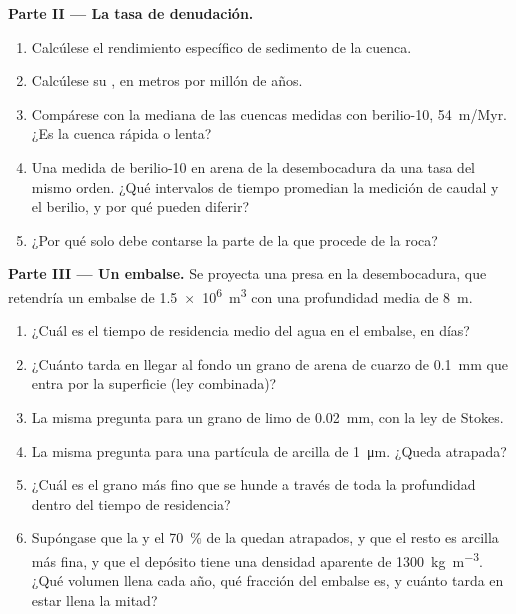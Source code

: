 \begin{problem}
\medskip
\noindent\textbf{Parte II --- La tasa de denudación.}
\begin{enumerate}[resume]
  \item Calcúlese el rendimiento específico de sedimento de la cuenca.
  \item Calcúlese su , en metros por millón de años.
  \item Compárese con la mediana de las cuencas medidas con berilio-10, \qty{54}{m/Myr}. ¿Es la cuenca rápida o lenta?
  \item Una medida de berilio-10 en arena de la desembocadura da una tasa del mismo orden. ¿Qué intervalos de tiempo promedian la medición de caudal
        y el berilio, y por qué pueden diferir?
  \item ¿Por qué solo debe contarse la parte de la  que procede de la roca?
\end{enumerate}

\medskip
\noindent\textbf{Parte III --- Un embalse.}
Se proyecta una presa en la desembocadura, que retendría un embalse de \qty{1.5e6}{m^3} con una profundidad media de \qty{8}{m}.
\begin{enumerate}[resume]
  \item ¿Cuál es el tiempo de residencia medio del agua en el embalse, en días?
  \item ¿Cuánto tarda en llegar al fondo un grano de arena de cuarzo de \qty{0.1}{mm} que entra por la superficie (ley combinada)?
  \item La misma pregunta para un grano de limo de \qty{0.02}{mm}, con la ley de Stokes.
  \item La misma pregunta para una partícula de arcilla de \qty{1}{\micro m}. ¿Queda atrapada?
  \item ¿Cuál es el grano más fino que se hunde a través de toda la profundidad dentro del tiempo de residencia?
  \item Supóngase que la  y el \qty{70}{\percent} de la  quedan atrapados, y que el resto es arcilla más fina, y que el depósito
        tiene una densidad aparente de \qty{1300}{kg.m^{-3}}. ¿Qué volumen llena cada año, qué fracción del embalse es, y cuánto tarda en estar llena la mitad?
\end{enumerate}


\end{problem}
